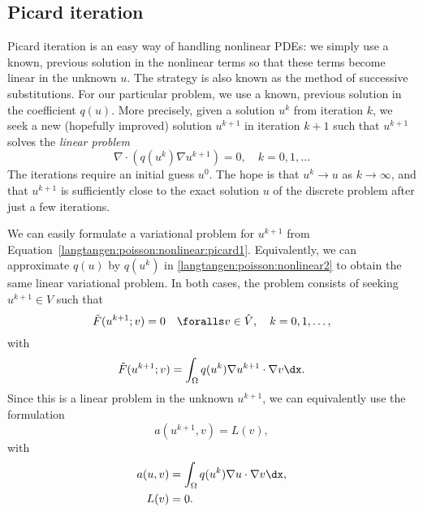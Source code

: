 \subsection{Picard iteration}
\label{langtangen:nonlinear:Picard}

Picard iteration is an easy way of handling nonlinear PDEs: we simply
use a known, previous solution in the nonlinear terms so that these
terms become linear in the unknown $u$. The strategy is also known as
the method of successive substitutions.
For our particular problem,
we use a known, previous solution in the coefficient $q(u)$.
More precisely, given a solution $u^k$ from iteration $k$, we seek a
new (hopefully improved) solution $u^{k+1}$ in iteration $k+1$ such
that $u^{k+1}$ solves the \emph{linear problem}
\begin{equation}
\label{langtangen:poisson:nonlinear:picard1}
\nabla\cdot \left(q(u^k)\nabla u^{k+1}\right) = 0,\quad k=0,1,\ldots
\end{equation}
The iterations require an initial guess $u^0$.
The hope is that $u^{k} \rightarrow u$ as $k\rightarrow\infty$, and that
$u^{k+1}$ is sufficiently close to the exact
solution $u$ of the discrete problem after just a few iterations.

We can easily formulate a variational problem for $u^{k+1}$ from
Equation~\eqref{langtangen:poisson:nonlinear:picard1}.
Equivalently, we can approximate $q(u)$ by $q(u^k)$ in
\eqref{langtangen:poisson:nonlinear2}
to obtain the same linear variational problem.
In both cases, the problem consists of seeking
$u^{k+1} \in V$ such that
\begin{equation} \label{langtangen:poisson:nonlinear:picard2}
  \tilde F(u^{k+1}; v) = 0 \quad \foralls v \in \hat{V},\quad k=0,1,\ldots,
\end{equation}
with
\begin{equation}
\label{langtangen:poisson:nonlinear:picard3}
\tilde F(u^{k+1}; v) = \int_\Omega q(u^k)\nabla u^{k+1}\cdot \nabla v\dx
.
\end{equation}
Since this is a linear problem in the unknown $u^{k+1}$, we can equivalently
use the formulation
\begin{equation}
a(u^{k+1},v) = L(v),
\end{equation}
with
\begin{align}
a(u,v) &= \int_\Omega q(u^k)\nabla u\cdot \nabla v\dx,
\\
L(v) &= 0.
\end{align}

